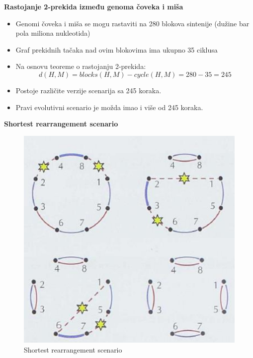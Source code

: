 \noindent \textbf{Rastojanje 2-prekida između genoma čoveka i miša}
\begin{itemize}
    \item Genomi čoveka i miša se mogu rastaviti na 280 blokova sintenije (dužine bar pola miliona nukleotida)
    \item Graf prekidnih tačaka nad ovim blokovima ima ukupno 35 ciklusa
    \item Na osnovu teoreme o rastojanju 2-prekida:
    $$d(H, M) = blocks(H, M) - cycle(H, M) = 280 - 35 = 245$$
    \item Postoje različite verzije scenarija sa 245 koraka.
    \item Pravi evolutivni scenario je možda imao i više od 245 koraka.
\end{itemize}
\newpage
\hspace{3cm} {\textbf{Shortest rearrangement scenario}}

\begin{figure}[h!]
\centering
\includegraphics[scale=0.65]{poglavlja/6/slike/izmena2prekidima3.PNG}
\caption{Shortest rearrangement scenario}
\label{slika:X}
\end{figure}

